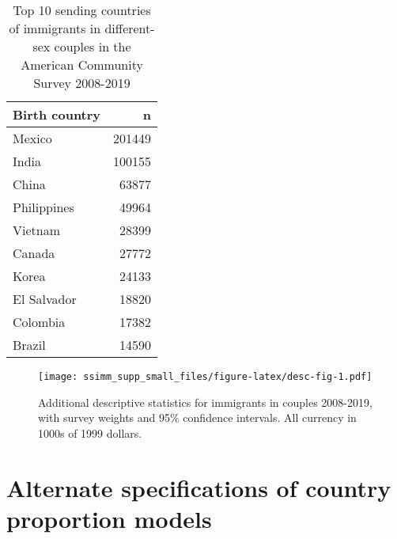 \documentclass[
  11pt,
]{article}
\begin{document}
\begin{table}

\caption{\label{tab:desc-top2}Top 10 sending countries of immigrants in different-sex couples in the American Community Survey 2008-2019}
\centering
\begin{tabular}[t]{lr}
\toprule
Birth country & n\\
\midrule
Mexico & 201449\\
India & 100155\\
China & 63877\\
Philippines & 49964\\
Vietnam & 28399\\
\addlinespace
Canada & 27772\\
Korea & 24133\\
El Salvador & 18820\\
Colombia & 17382\\
Brazil & 14590\\
\bottomrule
\end{tabular}
\end{table}

\begin{figure}
\centering
\texttt{[image: ssimm\_supp\_small\_files/figure-latex/desc-fig-1.pdf]}
\caption{\label{fig:desc-fig}Additional descriptive statistics for immigrants in couples 2008-2019, with survey weights and 95\% confidence intervals. All currency in 1000s of 1999 dollars.}
\end{figure}

\newpage

\hypertarget{alternate-specifications-of-country-proportion-models}{%
\section{Alternate specifications of country proportion models}\label{alternate-specifications-of-country-proportion-models}}
\end{document}
